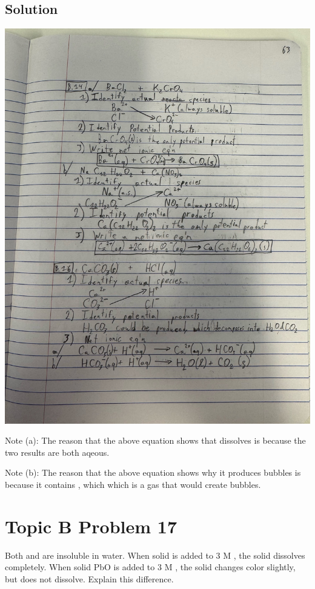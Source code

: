 \documentclass[10pt]{article}
\begin{document}
        \subsection{Solution}
            \begin{center}
                \includegraphics[width=\textwidth, trim={5in 7in 1in 32in},clip]{"Answers Images/IMG_6649.jpg"}
            \end{center}

            Note (a): The reason that the above equation shows that  dissolves is because the two results are both aqeous.

            Note (b): The reason that the above equation shows why it produces bubbles is because it contains , which which is a gas that would create bubbles.

    \pagebreak
    \section{Topic B Problem 17}
        Both  and  are insoluble in water. When solid  is added to 3 M , the solid dissolves completely. 
        When solid PbO is added to 3 M , the solid changes color slightly, but does not dissolve. 
        Explain this difference.
\end{document}
